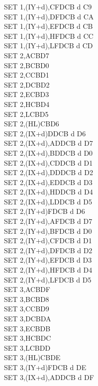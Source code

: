 \begin{multicols}{3}
{\begin{tabbing}
		SET 1,(IY+d),C\UNDOC\>FDCB d C9\\
		SET 1,(IY+d),D\UNDOC\>FDCB d CA\\
		SET 1,(IY+d),E\UNDOC\>FDCB d CB\\
		SET 1,(IY+d),H\UNDOC\>FDCB d CC\\
		SET 1,(IY+d),L\UNDOC\>FDCB d CD\\
		SET 2,A\>CBD7\\
		SET 2,B\>CBD0\\
		SET 2,C\>CBD1\\
		SET 2,D\>CBD2\\
		SET 2,E\>CBD3\\
		SET 2,H\>CBD4\\
		SET 2,L\>CBD5\\
		SET 2,(HL)\>CBD6\\
		SET 2,(IX+d)\>DDCB d D6\\
		SET 2,(IX+d),A\UNDOC\>DDCB d D7\\
		SET 2,(IX+d),B\UNDOC\>DDCB d D0\\
		SET 2,(IX+d),C\UNDOC\>DDCB d D1\\
		SET 2,(IX+d),D\UNDOC\>DDCB d D2\\
		SET 2,(IX+d),E\UNDOC\>DDCB d D3\\
		SET 2,(IX+d),H\UNDOC\>DDCB d D4\\
		SET 2,(IX+d),L\UNDOC\>DDCB d D5\\
		SET 2,(IY+d)\>FDCB d D6\\
		SET 2,(IY+d),A\UNDOC\>FDCB d D7\\
		SET 2,(IY+d),B\UNDOC\>FDCB d D0\\
		SET 2,(IY+d),C\UNDOC\>FDCB d D1\\
		SET 2,(IY+d),D\UNDOC\>FDCB d D2\\
		SET 2,(IY+d),E\UNDOC\>FDCB d D3\\
		SET 2,(IY+d),H\UNDOC\>FDCB d D4\\
		SET 2,(IY+d),L\UNDOC\>FDCB d D5\\
		SET 3,A\>CBDF\\
		SET 3,B\>CBD8\\
		SET 3,C\>CBD9\\
		SET 3,D\>CBDA\\
		SET 3,E\>CBDB\\
		SET 3,H\>CBDC\\
		SET 3,L\>CBDD\\
		SET 3,(HL)\>CBDE\\
		SET 3,(IY+d)\>FDCB d DE\\
		SET 3,(IX+d),A\UNDOC\>DDCB d DF\\

\end{tabbing}}
\end{multicols}
